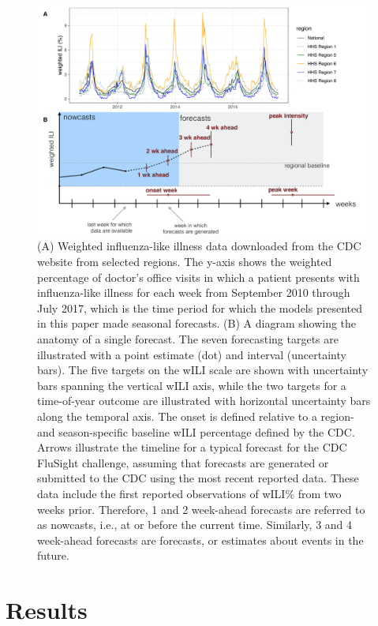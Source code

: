 \documentclass[9pt,twocolumn,twoside]{pnas-new}\usepackage[]{graphicx}\usepackage[]{color}
\begin{document}
\begin{figure}[htbp]
\centering
\includegraphics[width=.8\linewidth]{static-figures/timezero-sketch.pdf}
\caption{(A) Weighted influenza-like illness data downloaded from the CDC website from selected regions. The y-axis shows the weighted percentage of doctor's office visits in which a patient presents with influenza-like illness for each week from September 2010 through July 2017, which is the time period for which the models presented in this paper made seasonal forecasts. (B) A diagram showing the anatomy of a single forecast. The seven forecasting targets are illustrated with a point estimate (dot) and interval (uncertainty bars). The five targets on the wILI scale are shown with uncertainty bars spanning the vertical wILI axis, while the two targets for a time-of-year outcome are illustrated with horizontal uncertainty bars along the temporal axis. The onset is defined relative to a region- and season-specific baseline wILI percentage defined by the CDC.\cite{biggerstaff2018systematic} Arrows illustrate the timeline for a typical forecast for the CDC FluSight challenge, assuming that forecasts are generated or submitted to the CDC using the most recent reported data. These data include the first reported observations of wILI\% from two weeks prior. Therefore, 1 and 2 week-ahead forecasts are referred to as nowcasts, i.e., at or before the current time. Similarly, 3 and 4 week-ahead forecasts are forecasts, or estimates about events in the future.}
\label{fig:intro-schematic}
\end{figure}







\section*{Results}
\end{document}
